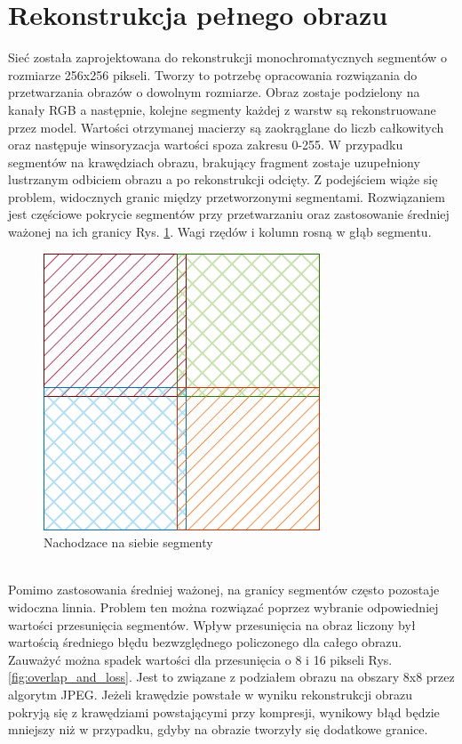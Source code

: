 \documentclass[a4paper, 12pt]{article}
\begin{document}
\section{Rekonstrukcja pełnego obrazu}
Sieć została zaprojektowana do rekonstrukcji monochromatycznych segmentów o rozmiarze 256x256 pikseli.
Tworzy to potrzebę opracowania rozwiązania do przetwarzania obrazów o dowolnym rozmiarze.
Obraz zostaje podzielony na kanały RGB a następnie, kolejne segmenty każdej z warstw są rekonstruowane przez model.
Wartości otrzymanej macierzy są zaokrąglane do liczb całkowitych oraz następuje winsoryzacja wartości spoza zakresu 0-255.
W przypadku segmentów na krawędziach obrazu, brakujący fragment zostaje uzupełniony lustrzanym odbiciem obrazu a po rekonstrukcji odcięty.
Z podejściem wiąże się problem, widocznych granic między przetworzonymi segmentami.
Rozwiązaniem jest częściowe pokrycie segmentów przy przetwarzaniu oraz zastosowanie średniej ważonej na ich granicy Rys. \ref{fig:overlap}.
Wagi rzędów i kolumn rosną w głąb segmentu.
\\
\begin{figure}[h!]
\begin{center}
	\includegraphics[width=0.4\columnwidth]{overlap.png}
	\caption{Nachodzace na siebie segmenty}
	\label{fig:overlap}
\end{center}
\end{figure}
\\
Pomimo zastosowania średniej ważonej, na granicy segmentów często pozostaje widoczna linnia.
Problem ten można rozwiązać poprzez wybranie odpowiedniej wartości przesunięcia segmentów.
Wpływ przesunięcia na obraz liczony był wartością średniego błędu bezwzględnego policzonego dla całego obrazu.
Zauważyć można spadek wartości dla przesunięcia o 8 i 16 pikseli Rys. \ref{fig:overlap_and_loss}.
Jest to związane z podziałem obrazu na obszary 8x8 przez algorytm JPEG.
Jeżeli krawędzie powstałe w wyniku rekonstrukcji obrazu pokryją się z krawędziami powstającymi przy kompresji,
wynikowy błąd będzie mniejszy niż w przypadku, gdyby na obrazie tworzyły się dodatkowe granice.
\end{document}
